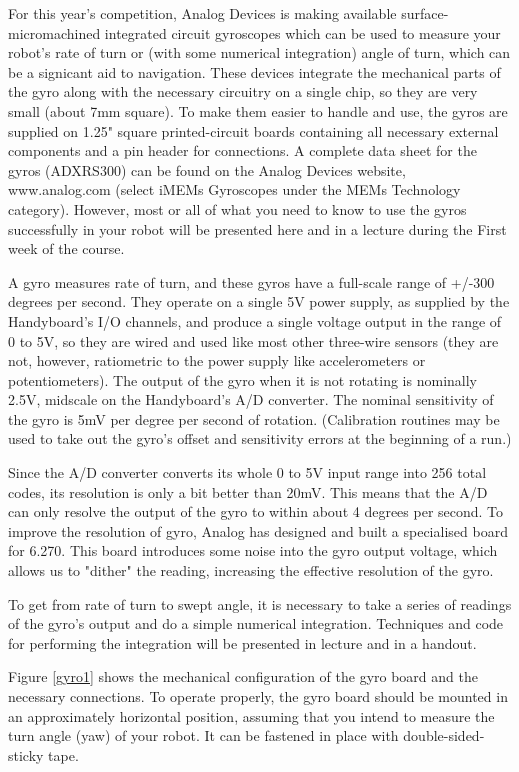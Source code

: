 For this year's competition, Analog Devices is making available surface-micromachined
integrated circuit gyroscopes which can be used to measure your robot's rate of turn or
(with some numerical integration) angle of turn, which can be a signicant aid to navigation.
These devices integrate the mechanical parts of the gyro along with the necessary
circuitry on a single chip, so they are very small (about 7mm square). To make them
easier to handle and use, the gyros are supplied on 1.25" square printed-circuit boards
containing all necessary external components and a pin header for connections.
A complete data sheet for the gyros (ADXRS300) can be found on the Analog Devices
website, www.analog.com (select iMEMs Gyroscopes under the MEMs Technology
category). However, most or all of what you need to know to use the gyros successfully
in your robot will be presented here and in a lecture during the First week of the course.

A gyro measures rate of turn, and these gyros have a full-scale range of +/-300 degrees
per second. They operate on a single 5V power supply, as supplied by the Handyboard's
I/O channels, and produce a single voltage output in the range of 0 to 5V, so they are
wired and used like most other three-wire sensors (they are not, however, ratiometric to
the power supply like accelerometers or potentiometers). The output of the gyro when
it is not rotating is nominally 2.5V, midscale on the Handyboard's A/D converter. The
nominal sensitivity of the gyro is 5mV per degree per second of rotation. (Calibration
routines may be used to take out the gyro's offset and sensitivity errors at the beginning
of a run.)

Since the A/D converter converts its whole 0 to 5V input range into 256 total codes,
its resolution is only a bit better than 20mV. This means that the A/D can only resolve
the output of the gyro to within about 4 degrees per second. To improve the resolution of
gyro, Analog has designed and built a specialised board for 6.270. This board introduces 
some noise into the gyro output voltage, which allows us to "dither" the reading,
increasing the effective resolution of the gyro.

To get from rate of turn to swept angle, it is necessary to take a series of readings 
of the gyro's output and do a simple numerical integration. Techniques and code for 
performing the integration will be presented in lecture and in a handout.

Figure \ref{gyro1} shows the mechanical configuration of the gyro board and the
necessary connections.  To operate properly, the gyro board should be
mounted in an approximately horizontal position, assuming that you
intend to measure the turn angle (yaw) of your robot.  It can be
fastened in place with double-sided-sticky tape.

